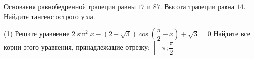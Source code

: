 \begin{consultation}
\begin{listofex}
		\item Основания равнобедренной трапеции равны \(17\) и \(87\). Высота трапеции равна \(14\). Найдите тангенс острого угла.
		\item %
		\begin{tasks}(1)
			\task Решите уравнение \( 2\sin^2 x - (2+\sqrt{3})\cos \left( \dfrac{\pi}{2} - x \right) + \sqrt{3} = 0 \)
			\task Найдите все корни этого уравнения, принадлежащие отрезку: \( \left[ -\pi; \dfrac{\pi}{2} \right] \)
		\end{tasks}
	\end{listofex}
\end{consultation}
